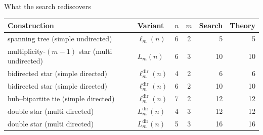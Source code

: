 \documentclass[aspectratio=1610,11pt]{beamer}
\begin{document}
\begin{frame}{What the search rediscovers}
\centering
\scriptsize
\renewcommand{\arraystretch}{1.25}
\begin{tabular}{llccrr}
\toprule
Construction & Variant & $n$ & $m$ & Search & Theory \\
\midrule
spanning tree (simple undirected) & $\ell_m(n)$ & 6 & 2 & 5 & 5 \\
multiplicity-$(m{-}1)$ star (multi undirected) & $L_m(n)$ & 6 & 3 & 10 & 10 \\
bidirected star (simple directed) & $\ell_m^{\mathrm{dir}}(n)$ & 4 & 2 & 6 & 6 \\
bidirected star (simple directed) & $\ell_m^{\mathrm{dir}}(n)$ & 6 & 2 & 10 & 10 \\
hub--bipartite tie (simple directed) & $\ell_m^{\mathrm{dir}}(n)$ & 7 & 2 & 12 & 12 \\
double star (multi directed) & $L_m^{\mathrm{dir}}(n)$ & 4 & 3 & 12 & 12 \\
double star (multi directed) & $L_m^{\mathrm{dir}}(n)$ & 5 & 3 & 16 & 16 \\
\bottomrule
\end{tabular}
\end{frame}
\end{document}
